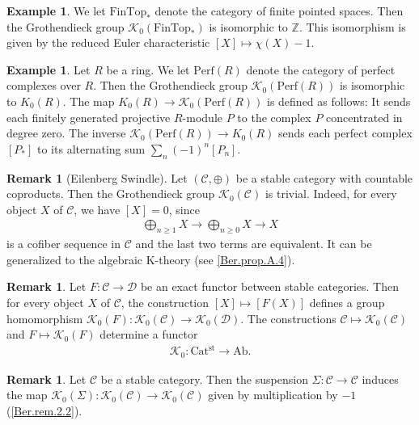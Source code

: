\documentclass[a4paper,dvipdfmx,11pt,reqno]{amsart}
\newcommand{\C}{\mathcal{C}}
\newcommand{\D}{\mathcal{D}}
\newcommand{\K}{\mathcal{K}}
\newcommand{\Catst}{\mathrm{Cat^{st}}}
\theoremstyle{definition}
\newtheorem{example}[theorem]{Example}
\newtheorem{remark}[theorem]{Remark}
\begin{document}
\begin{example} \label{Lur.eg.14.13}
  We let $\mathrm{FinTop}_{*}$ denote the category of finite pointed spaces. 
  Then the Grothendieck group $\K_0(\mathrm{FinTop}_{*})$ is isomorphic to $\mathbb{Z}$.
  This isomorphism is given by the reduced Euler characteristic $[X] \mapsto \chi(X)-1$.
\end{example}

\begin{example}
  Let $R$ be a ring.
    We let $\mathrm{Perf}(R)$ denote the category of perfect complexes over $R$.
    Then the Grothendieck group $\K_0(\mathrm{Perf}(R))$ is isomorphic to $K_0(R)$.
    The map $K_0(R) \to \K_0(\mathrm{Perf}(R))$ is defined as follows:
    It sends each finitely generated projective $R$-module $P$ to the complex $P$ concentrated in degree zero.
    The inverse $\K_0(\mathrm{Perf}(R)) \to K_0(R)$ sends each perfect complex $[P_{*}]$ to its alternating sum $\sum_{n}(-1)^n [P_n]$.
\end{example}

\begin{remark}[Eilenberg Swindle] \label{Lur.warn.14.12}
  Let $(\C,\oplus)$ be a stable category with countable coproducts.
  Then the Grothendieck group $\K_0(\C)$ is trivial.
  Indeed, for every object $X$ of $\C$, we have $[X] = 0$, since
  \begin{align*}
    \bigoplus_{n \geq 1} X \to \bigoplus_{n \geq 0} X \to X
  \end{align*}
  is a cofiber sequence in $\C$ and the last two terms are equivalent.
  It can be generalized to the algebraic K-theory (see \cref{Ber.prop.A.4}).
\end{remark}

\begin{remark} \label{Ber.rem.2.5}
  Let $F : \C \to \D$ be an exact functor between stable categories.
  Then for every object $X$ of $\C$, the construction $[X] \mapsto [F(X)]$ defines a group homomorphism $\K_0(F) : \K_0(\C) \to \K_0(\D)$.
  The constructions $\C \mapsto \K_0(\C)$ and $F \mapsto \K_0(F)$ determine a functor 
  \begin{align*}
    \K_0 : \Catst \to \mathrm{Ab}.
  \end{align*}
\end{remark}

\begin{remark}
  Let $\C$ be a stable category.
  Then the suspension $\Sigma : \C \to \C$ induces the map $\K_0(\Sigma) : \K_0(\C) \to \K_0(\C)$ given by multiplication by $-1$ (\cref{Ber.rem.2.2}).
\end{remark}
\end{document}
